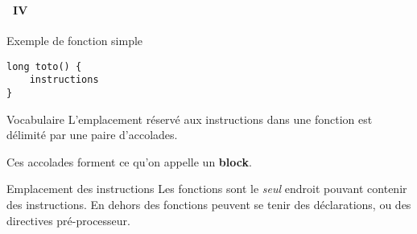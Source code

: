 \begin{frame}[containsverbatim]
  \frametitle{\secname}
  \framesubtitle{\subsecname~IV}
  
  \begin{exampleblock}{Exemple de fonction simple}
    \begin{verbatim}
long toto() {
    instructions
}       \end{verbatim}
  \end{exampleblock}
  \par
  \begin{block}{Vocabulaire}  
  L'emplacement réservé aux instructions dans une fonction est délimité par une paire d'accolades. 
  \par
  Ces accolades forment ce qu'on appelle un \textbf{block}.
  \end{block}

  \begin{alertblock}{Emplacement des instructions}
    Les fonctions sont le \emph{seul} endroit pouvant contenir des instructions. En dehors des fonctions peuvent se tenir des déclarations, ou des directives pré-processeur.     
  \end{alertblock}
\end{frame}

